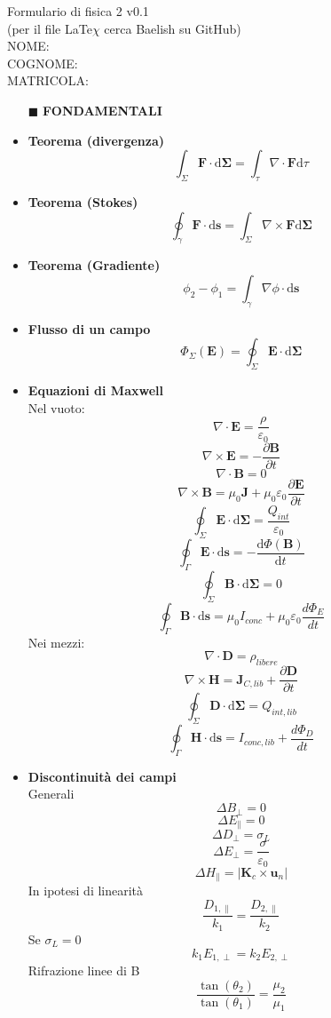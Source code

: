 \documentclass{book}
\newcommand{\g}{\textbf}
\newcommand{\h}{\mathbf}
\newcommand{\e}{\begin{equation}}
\newcommand{\ex}{\end{equation} }
\renewcommand{\it}{\item[$\cdot$]}
\begin{document}
\begin{multicols}{4}
Formulario di fisica 2 v0.1 \\
(per il file LaTe$\chi$ cerca Baelish su GitHub) \\
NOME: \\
COGNOME: \\
MATRICOLA: \\
\begin{itemize}
\hline
\item [$\blacksquare$] \g{FONDAMENTALI}
    \it \g{Teorema (divergenza)}
        \e{\int_\Sigma \h{F} \cdot \mathrm{d} \h{\Sigma}= \int_\tau \nabla \cdot \h{F} \mathrm{d}\tau} \ex
    \it \g{Teorema (Stokes)}
        \e{\oint_\gamma\h{F}\cdot \mathrm{d}\h{s}=\int_\Sigma \nabla \times \h{F} \mathrm{d}\h{\Sigma}} \ex
    \it \g{Teorema (Gradiente)}
        \e{\phi_2-\phi_1=\int_\gamma\nabla\phi\cdot \mathrm{d}\h{s} }\ex
    \it \g{Flusso di un campo}
        \e{ \Phi_\Sigma(\h{E})=\oint_\Sigma \h{E}\cdot \mathrm{d}\h{\Sigma}   
        } \ex
    \it \g{Equazioni di Maxwell} \\
        Nel vuoto:
        \e{\nabla\cdot\h{E}=\frac{\rho}{\varepsilon_0}}\ex
        \e{\nabla\times\h{E}=-\frac{\partial \h{B}}{\partial t}} \ex
        \e{\nabla\cdot\h{B}}=0\ex
        \e{\nabla\times\h{B}=\mu_0\h{J}+\mu_0\varepsilon_0\frac{\partial \h{E}}{\partial t}} \ex
        \e{\oint_\Sigma\h{E}\cdot \mathrm{d}\h{\Sigma}=\frac{Q_{int}}{\varepsilon_0}} \ex
        \e{\oint_\Gamma\h{E}\cdot \mathrm{d}\h{s}=-\frac{\mathrm{d} \Phi(\h{B})}{\mathrm{d}t}} \ex
        \e{\oint_\Sigma\h{B}\cdot \mathrm{d}\h{\Sigma}=0} \ex
        \e{\oint_\Gamma\h{B}\cdot \mathrm{d}\h{s}=\mu_0 I_{conc} +\mu_0\varepsilon_0\frac{d \Phi_E}{d t}} \ex
        Nei mezzi:
        \e{\nabla\cdot\h{D}=\rho_{libere}}\ex
        \e{\nabla\times\h{H}=\h{J}_{C,lib}+\frac{\partial\h{D}}{\partial t}} \ex
        \e{\oint_\Sigma\h{D}\cdot \mathrm{d}\h{\Sigma}=Q_{int,lib}} \ex
        \e{\oint_\Gamma\h{H}\cdot \mathrm{d}\h{s}=I_{conc,lib} + \frac{d \Phi_D}{d t}} \ex
    \it \g{Discontinuità dei campi} \\
        Generali
        \e{\Delta B_\perp=0}\ex
        \e{\Delta E_\parallel=0}\ex
        \e{\Delta D_\perp=\sigma_L} \ex
        \e{\Delta E_\perp=\frac{\sigma}{\varepsilon_0}}\ex
        \e{\Delta H_\parallel=|\h{K}_c\times\h{u}_n|}\ex
        In ipotesi di linearità
        \e{\frac{D_{1,\parallel}}{k_1}=\frac{D_{2,\parallel}}{k_2}}\ex
        Se $\sigma_L=0$
        \e{k_1E_{1,\perp}=k_2E_{2,\perp}}\ex
        Rifrazione linee di B
        \e{\frac{\tan(\theta_2)}{\tan(\theta_1)}=\frac{\mu_2}{\mu_1}} \ex
        

\end{itemize}
\end{multicols}
\end{document}
